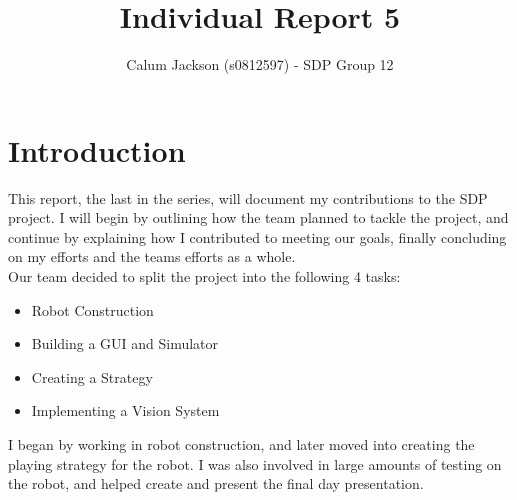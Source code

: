 \documentclass[12pt]{IEEEtran}
\begin{document}
	
\title{Individual Report 5}

\author{Calum Jackson (s0812597) - 
SDP Group 12}

\maketitle


\section{Introduction}
This report, the last in the series, will document my contributions to the SDP project. I will begin by outlining how the team planned to tackle the project, and continue by explaining how I contributed to meeting our goals, finally concluding on my efforts and the teams efforts as a whole.\\
Our team decided to split the project into the following 4 tasks:
\begin{itemize}
\item Robot Construction
\item Building a GUI and Simulator
\item Creating a Strategy
\item Implementing a Vision System
\end{itemize}

I began by working in robot construction, and later moved into creating the playing strategy for the robot. I was also involved in large amounts of testing on the robot, and helped create and present the final day presentation.
\end{document}
